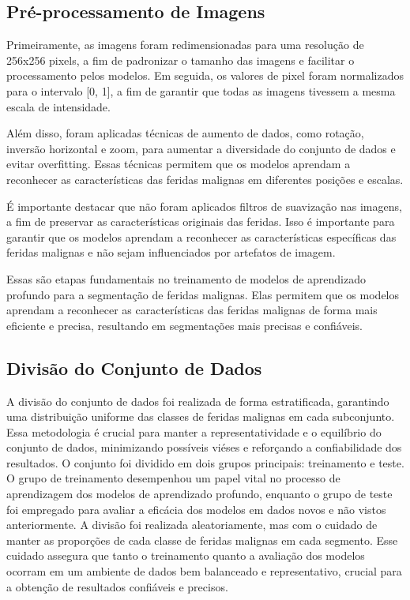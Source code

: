\subsection{Pré-processamento de Imagens}
    Primeiramente, as imagens foram redimensionadas para uma resolução de 256x256 pixels, a fim de padronizar o tamanho das imagens e facilitar o processamento pelos modelos. Em seguida, os valores de pixel foram normalizados para o intervalo [0, 1], a fim de garantir que todas as imagens tivessem a mesma escala de intensidade. 
    
    Além disso, foram aplicadas técnicas de aumento de dados, como rotação, inversão horizontal e zoom, para aumentar a diversidade do conjunto de dados e evitar overfitting. Essas técnicas permitem que os modelos aprendam a reconhecer as características das feridas malignas em diferentes posições e escalas.
    
    É importante destacar que não foram aplicados filtros de suavização nas imagens, a fim de preservar as características originais das feridas. Isso é importante para garantir que os modelos aprendam a reconhecer as características específicas das feridas malignas e não sejam influenciados por artefatos de imagem.
    
    Essas são etapas fundamentais no treinamento de modelos de aprendizado profundo para a segmentação de feridas malignas. Elas permitem que os modelos aprendam a reconhecer as características das feridas malignas de forma mais eficiente e precisa, resultando em segmentações mais precisas e confiáveis.

\subsection{Divisão do Conjunto de Dados}
    A divisão do conjunto de dados foi realizada de forma estratificada, garantindo uma distribuição uniforme das classes de feridas malignas em cada subconjunto. Essa metodologia é crucial para manter a representatividade e o equilíbrio do conjunto de dados, minimizando possíveis viéses e reforçando a confiabilidade dos resultados. O conjunto foi dividido em dois grupos principais: treinamento e teste. O grupo de treinamento desempenhou um papel vital no processo de aprendizagem dos modelos de aprendizado profundo, enquanto o grupo de teste foi empregado para avaliar a eficácia dos modelos em dados novos e não vistos anteriormente. A divisão foi realizada aleatoriamente, mas com o cuidado de manter as proporções de cada classe de feridas malignas em cada segmento. Esse cuidado assegura que tanto o treinamento quanto a avaliação dos modelos ocorram em um ambiente de dados bem balanceado e representativo, crucial para a obtenção de resultados confiáveis e precisos.

